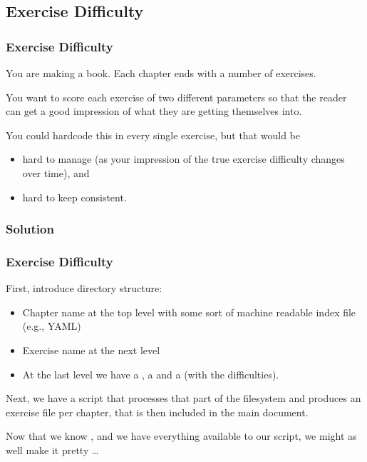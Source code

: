 {\subsection{Exercise Difficulty}
\begin{frame}[fragile]
  \frametitle{Exercise Difficulty}
  \vspace{3mm}
  You are making a book. Each chapter ends with a number of exercises.
  
  \vspace{5mm}
  You want to score each exercise of two different parameters so that the reader can get a good impression of what they are getting themselves into.
  
  \vspace{5mm}
  You could hardcode this in every single exercise, but that would be
  \begin{itemize}
    \item hard to manage (as your impression of the true exercise difficulty changes over time), and
    \item hard to keep consistent.
  \end{itemize}
\end{frame}

\subsubsection{Solution}
\begin{frame}[fragile]
  \frametitle{Exercise Difficulty }
  \vspace{3mm}
  First, introduce directory structure:
  \begin{itemize}
    \item Chapter name at the top level with some sort of machine readable index file (e.g., YAML)
    \item Exercise name at the next level
    \item At the last level we have a , a  and a  (with the difficulties).
  \end{itemize}
  
  \vspace{5mm}
  Next, we have a script that processes that part of the filesystem and produces an exercise file per chapter, that is then included in the main document.
  
  \vspace{5mm}
  Now that we know \TikZ, and we have everything available to our script, we might as well make it pretty \ldots
\end{frame}

}
